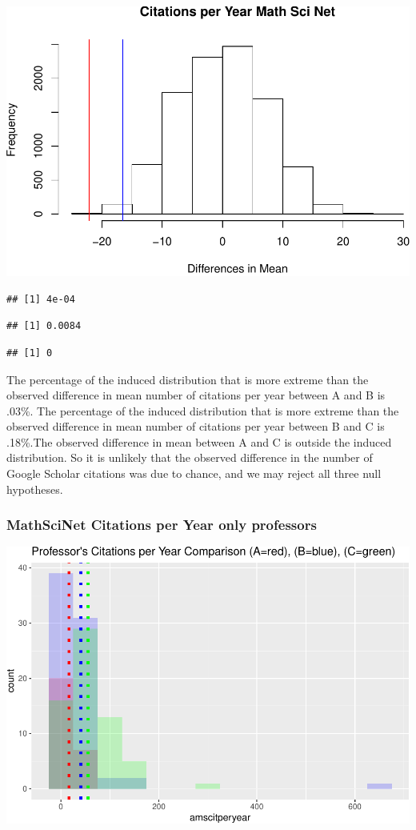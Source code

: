\documentclass[]{article}
\begin{document}
\includegraphics{final_files/figure-latex/unnamed-chunk-35-1.pdf}

\begin{verbatim}
## [1] 4e-04
\end{verbatim}

\begin{verbatim}
## [1] 0.0084
\end{verbatim}

\begin{verbatim}
## [1] 0
\end{verbatim}

The percentage of the induced distribution that is more extreme than the
observed difference in mean number of citations per year between A and B
is .03\%. The percentage of the induced distribution that is more
extreme than the observed difference in mean number of citations per
year between B and C is .18\%.The observed difference in mean between A
and C is outside the induced distribution. So it is unlikely that the
observed difference in the number of Google Scholar citations was due to
chance, and we may reject all three null hypotheses.

\hypertarget{mathscinet-citations-per-year-only-professors}{%
\subsubsection{MathSciNet Citations per Year only
professors}\label{mathscinet-citations-per-year-only-professors}}

\includegraphics{final_files/figure-latex/unnamed-chunk-37-1.pdf}
\end{document}
